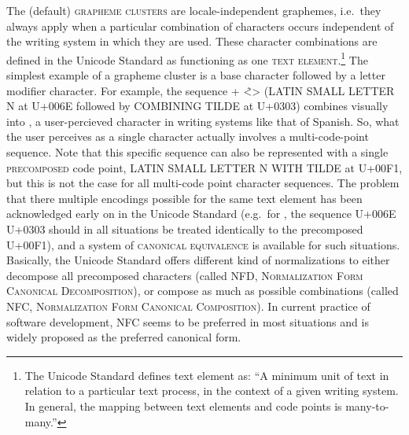 The (default) \textsc{grapheme clusters} are locale-independent graphemes, i.e.~they always apply when a particular combination of characters occurs independent of the writing system in which they are used. These character combinations are defined in the Unicode Standard as functioning as one \textsc{text element}.\footnote{The Unicode Standard defines text element as: ``A minimum unit of text in relation to a particular text process, in the context of a given writing system. In general, the mapping between text elements and code points is many-to-many.''} The simplest example of a grapheme cluster is a base character followed by a letter modifier character. For example, the sequence + <̃\textgreater{} (LATIN SMALL LETTER N at U+006E followed by COMBINING TILDE at U+0303) combines visually into , a user-percieved character in writing systems like that of Spanish. So, what the user perceives as a single character actually involves a multi-code-point sequence. Note that this specific sequence can also be represented with a single \textsc{precomposed} code point, LATIN SMALL LETTER N WITH TILDE at U+00F1, but this is not the case for all multi-code point character sequences. The problem that there multiple encodings possible for the same text element has been acknowledged early on in the Unicode Standard (e.g.~for , the sequence U+006E U+0303 should in all situations be treated identically to the precomposed U+00F1), and a system of \textsc{canonical equivalence} is available for such situations. Basically, the Unicode Standard offers different kind of normalizations to either decompose all precomposed characters (called \textsc{NFD}, \textsc{Normalization Form Canonical Decomposition}), or compose as much as possible combinations (called \textsc{NFC}, \textsc{Normalization Form Canonical Composition}). In current practice of software development, NFC seems to be preferred in most situations and is widely proposed as the preferred canonical form.

